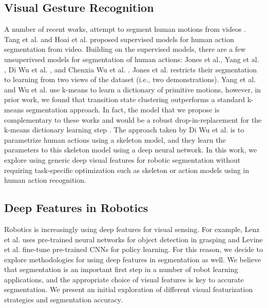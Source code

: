 \documentclass[0-main.tex]{subfiles}
\begin{document}
\subsection{Visual Gesture Recognition}
A number of recent works, attempt to segment human motions from videos \cite{hoai2011joint, tang2012learning, yang2013discovering, jones2014unsupervised, wu2014leveraging, wu2015watch}.
Tang et al. and Hoai et al. proposed supervised models for human action segmentation from video.
Building on the supervised models, there are a few unsuperivsed models for segmentation of human actions: Jones et al.\cite{jones2014unsupervised}, Yang et al. \cite{yang2013discovering}, Di Wu et al. \cite{wu2014leveraging} , and Chenxia Wu et al. \cite{wu2015watch}.
Jones et al. \cite{jones2014unsupervised} restricts their segmentation to learning from two views of the dataset (i.e., two demonstrations).
Yang et al. \cite{yang2013discovering} and Wu et al.  \cite{wu2015watch} use k-means to learn a dictionary of primitive motions, however, in prior work, we found that transition state clustering outperforms a standard k-means segmentation approach.
In fact, the model that we propose is complementary to these works and would be a robust drop-in-replacement for the k-means dictionary learning step \cite{krishnan2015tsc}.
The approach taken by Di Wu et al. is to parametrize human actions using a skeleton model, and they learn the parameters to this skeleton model using a deep neural network.
In this work, we explore using generic deep visual features for robotic segmentation without requiring task-specific optimization such as skeleton or action models using in human action recognition.

\subsection{Deep Features in Robotics}
Robotics is increasingly using deep features for visual sensing. For example, Lenz et al. uses pre-trained neural networks for object detection in grasping \cite{lenz2015deep} and
Levine et al. \cite{levine2015end} fine-tune pre-trained CNNs for policy learning.
For this reason, we decide to explore methodologies for using deep features in segmentation as well. We believe that segmentation is an important first step in a number of robot learning applications, and the appropriate choice of visual features is key to accurate segmentation.
We present an initial exploration of different visual featurization strategies and segmentation accuracy.
\end{document}
